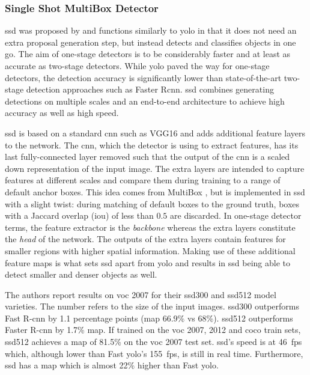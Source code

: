 \documentclass[draft,final]{vutinfth} %
\begin{document}
\subsubsection{Single Shot MultiBox Detector}
\label{sssec:theory-ssd}

\gls{ssd} was proposed by \textcite{liu2016} and functions similarly
to \gls{yolo} in that it does not need an extra proposal generation
step, but instead detects and classifies objects in one go. The aim of
one-stage detectors is to be considerably faster and at least as
accurate as two-stage detectors. While \gls{yolo} paved the way for
one-stage detectors, the detection accuracy is significantly lower
than state-of-the-art two-stage detection approaches such as Faster
R\gls{cnn}. \gls{ssd} combines generating detections on multiple
scales and an end-to-end architecture to achieve high accuracy as well
as high speed.

\gls{ssd} is based on a standard \gls{cnn} such as VGG16
\cite{liu2015} and adds additional feature layers to the network. The
\gls{cnn}, which the detector is using to extract features, has its
last fully-connected layer removed such that the output of the
\gls{cnn} is a scaled down representation of the input image. The
extra layers are intended to capture features at different scales and
compare them during training to a range of default anchor boxes. This
idea comes from MultiBox \cite{erhan2014}, but is implemented in
\gls{ssd} with a slight twist: during matching of default boxes to the
ground truth, boxes with a Jaccard overlap (\gls{iou}) of less than
$0.5$ are discarded. In one-stage detector terms, the feature
extractor is the \emph{backbone} whereas the extra layers constitute
the \emph{head} of the network. The outputs of the extra layers
contain features for smaller regions with higher spatial
information. Making use of these additional feature maps is what sets
\gls{ssd} apart from \gls{yolo} and results in \gls{ssd} being able to
detect smaller and denser objects as well.

The authors report results on \gls{voc} 2007 for their \gls{ssd}300
and \gls{ssd}512 model varieties. The number refers to the size of the
input images. \gls{ssd}300 outperforms Fast R-\gls{cnn} by 1.1
percentage points (\gls{map} 66.9\% vs 68\%). \gls{ssd}512 outperforms
Faster R-\gls{cnn} by 1.7\% \gls{map}. If trained on the \gls{voc}
2007, 2012 and \gls{coco} train sets, \gls{ssd}512 achieves a
\gls{map} of 81.5\% on the \gls{voc} 2007 test set. \gls{ssd}'s speed
is at \qty{46}{fps} which, although lower than Fast \gls{yolo}'s
\qty{155}{fps}, is still in real time. Furthermore, \gls{ssd} has a
\gls{map} which is almost 22\% higher than Fast \gls{yolo}.
\end{document}
